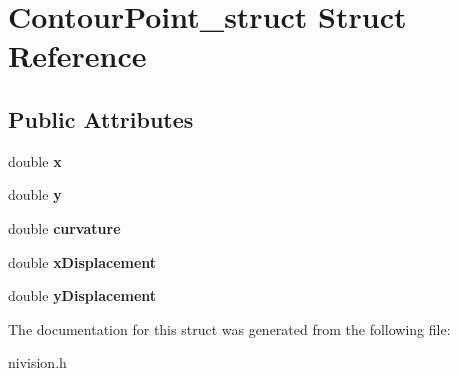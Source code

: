 \hypertarget{structContourPoint__struct}{\section{\-Contour\-Point\-\_\-struct \-Struct \-Reference}
\label{structContourPoint__struct}
}
\subsection*{\-Public \-Attributes}
\begin{DoxyCompactItemize}
\item 
\hypertarget{structContourPoint__struct_a207e465f5d540c2583a92b88c0e9db06}{double {\bfseries x}}\label{structContourPoint__struct_a207e465f5d540c2583a92b88c0e9db06}

\item 
\hypertarget{structContourPoint__struct_a97e2a57f6af6ef540f0b32936d67db84}{double {\bfseries y}}\label{structContourPoint__struct_a97e2a57f6af6ef540f0b32936d67db84}

\item 
\hypertarget{structContourPoint__struct_a7a03ee976e25bea70c3ad25cf6d5c250}{double {\bfseries curvature}}\label{structContourPoint__struct_a7a03ee976e25bea70c3ad25cf6d5c250}

\item 
\hypertarget{structContourPoint__struct_aa1ae63419763b8ed3753ed924861750a}{double {\bfseries x\-Displacement}}\label{structContourPoint__struct_aa1ae63419763b8ed3753ed924861750a}

\item 
\hypertarget{structContourPoint__struct_a3482b1c9033dc6a5309b39837485cc20}{double {\bfseries y\-Displacement}}\label{structContourPoint__struct_a3482b1c9033dc6a5309b39837485cc20}

\end{DoxyCompactItemize}


\-The documentation for this struct was generated from the following file\-:\begin{DoxyCompactItemize}
\item 
nivision.\-h\end{DoxyCompactItemize}
